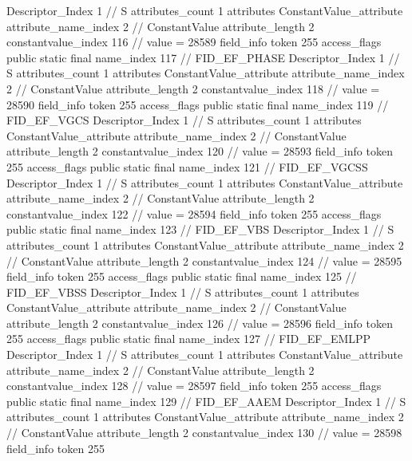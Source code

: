 {{{{{				Descriptor_Index	1		// S
				attributes_count	1
				attributes {
				ConstantValue_attribute {
					attribute_name_index	2		// ConstantValue
					attribute_length	2
					constantvalue_index	116		// value = 28589
				}
				}
			}
			field_info {
				token	255
				access_flags	public static final
				name_index	117		// FID_EF_PHASE
				Descriptor_Index	1		// S
				attributes_count	1
				attributes {
				ConstantValue_attribute {
					attribute_name_index	2		// ConstantValue
					attribute_length	2
					constantvalue_index	118		// value = 28590
				}
				}
			}
			field_info {
				token	255
				access_flags	public static final
				name_index	119		// FID_EF_VGCS
				Descriptor_Index	1		// S
				attributes_count	1
				attributes {
				ConstantValue_attribute {
					attribute_name_index	2		// ConstantValue
					attribute_length	2
					constantvalue_index	120		// value = 28593
				}
				}
			}
			field_info {
				token	255
				access_flags	public static final
				name_index	121		// FID_EF_VGCSS
				Descriptor_Index	1		// S
				attributes_count	1
				attributes {
				ConstantValue_attribute {
					attribute_name_index	2		// ConstantValue
					attribute_length	2
					constantvalue_index	122		// value = 28594
				}
				}
			}
			field_info {
				token	255
				access_flags	public static final
				name_index	123		// FID_EF_VBS
				Descriptor_Index	1		// S
				attributes_count	1
				attributes {
				ConstantValue_attribute {
					attribute_name_index	2		// ConstantValue
					attribute_length	2
					constantvalue_index	124		// value = 28595
				}
				}
			}
			field_info {
				token	255
				access_flags	public static final
				name_index	125		// FID_EF_VBSS
				Descriptor_Index	1		// S
				attributes_count	1
				attributes {
				ConstantValue_attribute {
					attribute_name_index	2		// ConstantValue
					attribute_length	2
					constantvalue_index	126		// value = 28596
				}
				}
			}
			field_info {
				token	255
				access_flags	public static final
				name_index	127		// FID_EF_EMLPP
				Descriptor_Index	1		// S
				attributes_count	1
				attributes {
				ConstantValue_attribute {
					attribute_name_index	2		// ConstantValue
					attribute_length	2
					constantvalue_index	128		// value = 28597
				}
				}
			}
			field_info {
				token	255
				access_flags	public static final
				name_index	129		// FID_EF_AAEM
				Descriptor_Index	1		// S
				attributes_count	1
				attributes {
				ConstantValue_attribute {
					attribute_name_index	2		// ConstantValue
					attribute_length	2
					constantvalue_index	130		// value = 28598
				}
				}
			}
			field_info {
				token	255
}}}}}
